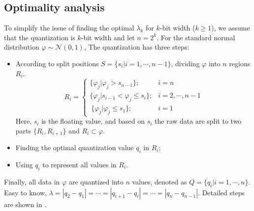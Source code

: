 \subsection{Optimality analysis}
To simplify the issue of finding the optimal $\lambda_k$ for $k$-bit width ($k\ge1$), we assume that the quantization is $k$-bit width and let $n = 2^k$.
For the standard normal distribution $\varphi \sim \mathcal{N}(0,1)$, The quantization has three steps:
\begin{itemize}
    \item According to split positions $S=\{s_i|i=1,\cdots,n-1\}$, dividing $\varphi$ into $n$ regions $R_i$.
\begin{equation}
    R_i = \begin{cases}
    \{\varphi_j|\varphi_j>s_{n-1}\};& i=n\\
    \{\varphi_j|s_{i-1}<\varphi_j\le s_{i}\};& i=2, \cdots, n-1\\\
    \{\varphi_j|\varphi_j \le s_1\};&i=1\
    \end{cases}
\end{equation}
Here, $s_i$ is the floating value, and based on $s_i$ the raw data are split to two parts $\{R_i,R_{i+1}\}$ and $R_i \subset \varphi$.
\item  Finding the optimal quantization value $q_i$ in $R_i$; %
\item Using $q_i$ to represent all values in $R_i$. 
\end{itemize}
Finally, all data in $\varphi$ are quantized into $n$ values, denoted as $Q=\{q_i|i=1,\cdots,n\}$. 
Easy to know, $\lambda=|q_{2}-q_1|=\cdots=|q_{i+1}-q_i|=\cdots=|q_{n}-q_{n-1}|$. Detailed steps are shown in .%

